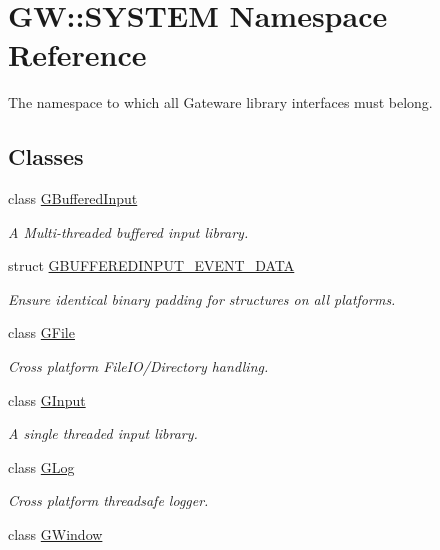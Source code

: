 \hypertarget{namespaceGW_1_1SYSTEM}{}\section{GW\+:\+:S\+Y\+S\+T\+EM Namespace Reference}
\label{namespaceGW_1_1SYSTEM}


The namespace to which all Gateware library interfaces must belong.  


\subsection*{Classes}
\begin{DoxyCompactItemize}
\item 
class \mbox{\hyperlink{classGW_1_1SYSTEM_1_1GBufferedInput}{G\+Buffered\+Input}}
\begin{DoxyCompactList}\small\item\em A Multi-\/threaded buffered input library. \end{DoxyCompactList}\item 
struct \mbox{\hyperlink{structGW_1_1SYSTEM_1_1GBUFFEREDINPUT__EVENT__DATA}{G\+B\+U\+F\+F\+E\+R\+E\+D\+I\+N\+P\+U\+T\+\_\+\+E\+V\+E\+N\+T\+\_\+\+D\+A\+TA}}
\begin{DoxyCompactList}\small\item\em Ensure identical binary padding for structures on all platforms. \end{DoxyCompactList}\item 
class \mbox{\hyperlink{classGW_1_1SYSTEM_1_1GFile}{G\+File}}
\begin{DoxyCompactList}\small\item\em Cross platform File\+I\+O/\+Directory handling. \end{DoxyCompactList}\item 
class \mbox{\hyperlink{classGW_1_1SYSTEM_1_1GInput}{G\+Input}}
\begin{DoxyCompactList}\small\item\em A single threaded input library. \end{DoxyCompactList}\item 
class \mbox{\hyperlink{classGW_1_1SYSTEM_1_1GLog}{G\+Log}}
\begin{DoxyCompactList}\small\item\em Cross platform threadsafe logger. \end{DoxyCompactList}\item 
class \mbox{\hyperlink{classGW_1_1SYSTEM_1_1GWindow}{G\+Window}}

\end{DoxyCompactItemize}
